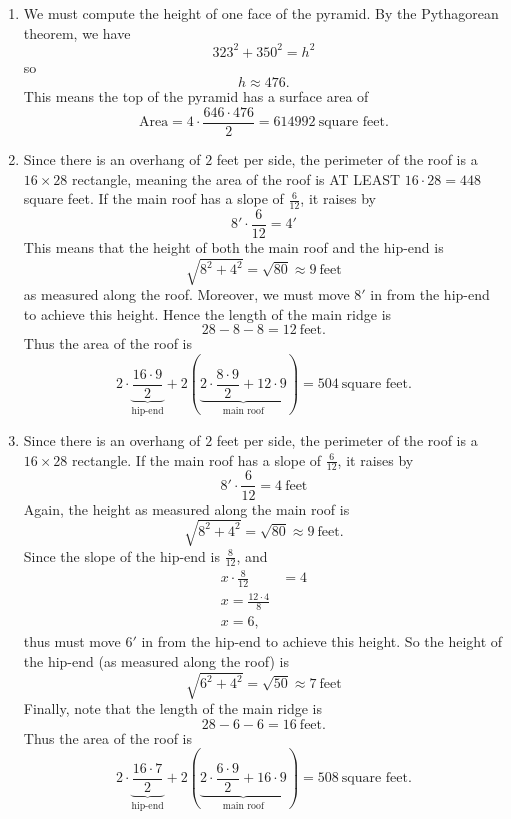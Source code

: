 \documentclass[hints,nooutcomes,noauthor,handout,12pt]{ximera}
\begin{document}
\begin{question}
\begin{freeResponse}
  \begin{enumerate}
    \item We must compute the height of one face of the pyramid. By
      the Pythagorean theorem, we have
      \[
      323^2 + 350^2 = h^2
      \]
      so
      \[
      h \approx 476.
      \]
      This means the top of the pyramid has a surface area of
      \[
      \text{Area} = 4\cdot \frac{646\cdot 476}{2} = 614992~\text{square feet}.
      \]
    \item Since there is an overhang of $2$ feet per side, the
      perimeter of the roof is a $16\times 28$ rectangle, meaning the
      area of the roof is AT LEAST $16\cdot 28 = 448$ square feet. If
      the main roof has a slope of $\frac{6}{12}$, it raises by
      \[
      8'\cdot \frac{6}{12}  = 4'
      \]
      This means that the height of both the main roof and the hip-end is
      \[
      \sqrt{8^2+4^2} = \sqrt{80} \approx 9~\text{feet}
      \]
      as measured along the roof. Moreover, we must move $8'$ in from
      the hip-end to achieve this height. Hence the length of the main
      ridge is
      \[
      28-8-8 = 12~\text{feet}.
      \]
      Thus the area of the roof is
      \[
      2\cdot \underbrace{\frac{16\cdot 9}{2}}_{\text{hip-end}} +
      2\left(\underbrace{2\cdot \frac{8\cdot 9}{2} + 12\cdot
        9}_{\text{main roof}}\right) = 504~\text{square feet}.
      \]
    \item Since there is an overhang of $2$ feet per side, the
      perimeter of the roof is a $16\times 28$ rectangle. If the main
      roof has a slope of $\frac{6}{12}$, it raises by
      \[
      8'\cdot \frac{6}{12}  = 4~\text{feet}
      \]
      Again, the height as measured along the main roof is
      \[
      \sqrt{8^2+4^2} = \sqrt{80}\approx 9~\text{feet}.
      \]
      Since the slope of the hip-end is $\frac{8}{12}$, and
      \begin{align*}
        x\cdot \frac{8}{12} &= 4\\
        x = \frac{12\cdot 4}{8}\\
        x = 6,
      \end{align*}
      thus must move $6'$ in from the hip-end to achieve this height.
      So the height of the hip-end (as measured along the roof) is
      \[
      \sqrt{6^2+4^2} = \sqrt{50} \approx 7~\text{feet}
      \]
      Finally, note that the length of the main ridge is
      \[
      28-6-6 = 16~\text{feet}.
      \]
      Thus the area of the roof is
      \[
      2\cdot \underbrace{\frac{16\cdot 7}{2}}_{\text{hip-end}} +
      2\left(\underbrace{2\cdot \frac{6\cdot 9}{2} + 16\cdot
        9}_{\text{main roof}}\right) = 508~\text{square feet}.
      \]
  \end{enumerate}
\end{freeResponse}


\end{question}
\mynewpage
\end{document}
